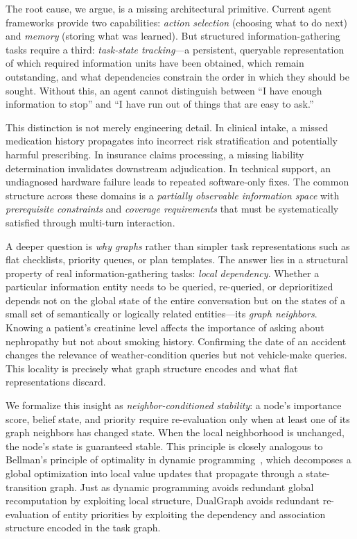 \documentclass[11pt,a4paper]{article}
\begin{document}
The root cause, we argue, is a missing architectural primitive. Current agent
frameworks provide two capabilities: \emph{action selection} (choosing what to
do next) and \emph{memory} (storing what was learned). But structured
information-gathering tasks require a third: \emph{task-state tracking}---a
persistent, queryable representation of which required information units have
been obtained, which remain outstanding, and what dependencies constrain the
order in which they should be sought. Without this, an agent cannot distinguish
between ``I have enough information to stop'' and ``I have run out of things
that are easy to ask.''

This distinction is not merely engineering detail. In clinical intake, a missed
medication history propagates into incorrect risk stratification and potentially
harmful prescribing. In insurance claims processing, a missing liability
determination invalidates downstream adjudication. In technical support, an
undiagnosed hardware failure leads to repeated software-only fixes. The common
structure across these domains is a \emph{partially observable information
space} with \emph{prerequisite constraints} and \emph{coverage requirements}
that must be systematically satisfied through multi-turn interaction.

A deeper question is \emph{why graphs} rather than simpler task
representations such as flat checklists, priority queues, or plan templates.
The answer lies in a structural property of real information-gathering tasks:
\emph{local dependency}. Whether a particular information entity needs to be
queried, re-queried, or deprioritized depends not on the global state of
the entire conversation but on the states of a small set of semantically
or logically related entities---its \emph{graph neighbors}. Knowing a
patient's creatinine level affects the importance of asking about nephropathy
but not about smoking history. Confirming the date of an accident changes the
relevance of weather-condition queries but not vehicle-make queries. This
locality is precisely what graph structure encodes and what flat
representations discard.

We formalize this insight as \emph{neighbor-conditioned stability}: a node's
importance score, belief state, and priority require re-evaluation only when
at least one of its graph neighbors has changed state. When the local
neighborhood is unchanged, the node's state is guaranteed stable. This
principle is closely analogous to Bellman's principle of optimality in dynamic
programming~\cite{bellman1957dynamic}, which decomposes a global optimization
into local value updates that propagate through a state-transition graph.
Just as dynamic programming avoids redundant global recomputation by exploiting
local structure, DualGraph avoids redundant re-evaluation of entity priorities
by exploiting the dependency and association structure encoded in the task
graph.
\end{document}
